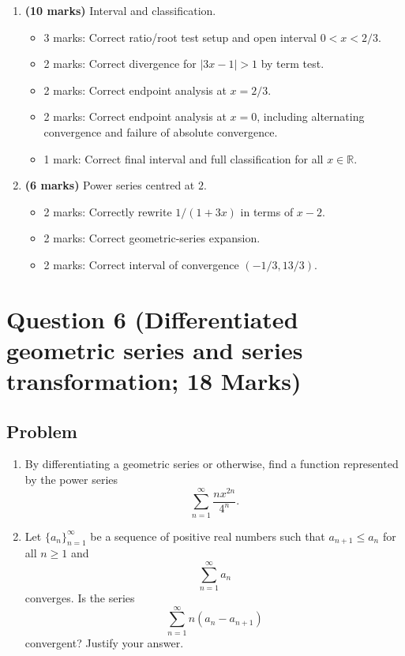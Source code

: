 \documentclass[12pt]{article}
\newcommand{\R}{\mathbb{R}}
\newcommand{\abs}[1]{\left|#1\right|}
\begin{document}
\begin{enumerate}[label=(\alph*)]
\item \textbf{(10 marks)} Interval and classification.
\begin{itemize}
\item 3 marks: Correct ratio/root test setup and open interval $0<x<2/3$.
\item 2 marks: Correct divergence for $\abs{3x-1}>1$ by term test.
\item 2 marks: Correct endpoint analysis at $x=2/3$.
\item 2 marks: Correct endpoint analysis at $x=0$, including alternating convergence and failure of absolute convergence.
\item 1 mark: Correct final interval and full classification for all $x\in\R$.
\end{itemize}

\item \textbf{(6 marks)} Power series centred at $2$.
\begin{itemize}
\item 2 marks: Correctly rewrite $1/(1+3x)$ in terms of $x-2$.
\item 2 marks: Correct geometric-series expansion.
\item 2 marks: Correct interval of convergence $(-1/3,13/3)$.
\end{itemize}
\end{enumerate}

\newpage
\section{Question 6 (Differentiated geometric series and series transformation; 18 Marks)}

\subsection{Problem}

\begin{enumerate}[label=(\alph*)]
\item By differentiating a geometric series or otherwise, find a function represented by the power series
\[
\sum_{n=1}^{\infty}\frac{nx^{2n}}{4^n}.
\]

\item Let $\{a_n\}_{n=1}^{\infty}$ be a sequence of positive real numbers such that $a_{n+1}\leq a_n$ for all $n\geq 1$ and
\[
\sum_{n=1}^{\infty}a_n
\]
converges. Is the series
\[
\sum_{n=1}^{\infty}n(a_n-a_{n+1})
\]
convergent? Justify your answer.
\end{enumerate}
\end{document}
